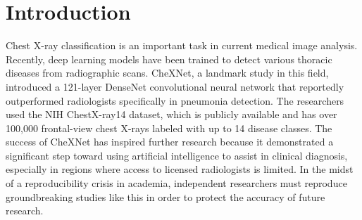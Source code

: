 \begin{abstract}
Deep learning for radiologic image analysis is a rapidly growing field in
biomedical research and is likely to become a standard practice in modern
medicine. We used the publicly available NIH ChestX-ray14 dataset, containing
112,120 frontal-view chest X-rays labeled for 14 thoracic pathologies in order to
reproduce the 14-pathology extension of CheXNet and built a modified model,
CXRNet. The reproduced CheXNet model achieved a mean test AUROC of 0.8125,
compared with 0.8414 calculated from the 14 per-pathology AUROCs reported in the
original article. The modified model, CXRNet achieved a mean test AUROC of 0.8474. As a secondary
analysis, per-pathology decision thresholds selected only on the validation set
produced test macro F1 scores of 0.2813 for the CheXNet reproduction and 0.3414
for CXRNet. The original pneumonia-versus-radiologist F1 experiment could not
be reproduced because its expert annotations for the 420-image test set are not
publicly available.
\end{abstract}

\section{Introduction}

Chest X-ray classification is an important task in current medical image analysis. Recently, 
deep learning models have been trained to detect various thoracic diseases from
radiographic scans. CheXNet, a landmark study in this field,
introduced a 121-layer DenseNet convolutional neural network that reportedly
outperformed radiologists specifically in pneumonia detection\cite{rajpurkar2017}.
The researchers used the NIH ChestX-ray14 dataset, which is publicly available and has over
100,000 frontal-view chest X-rays labeled with up to 14 disease
classes\cite{nihxray2017}. The success of CheXNet has inspired further
research because it demonstrated a significant step toward using artificial
intelligence to assist in clinical diagnosis, especially in regions where
access to licensed radiologists is limited\cite{hwang2023}. In the midst of a
reproducibility crisis in academia, independent researchers must reproduce
groundbreaking studies like this in order to protect the accuracy of future
research\cite{noorden2015}.

